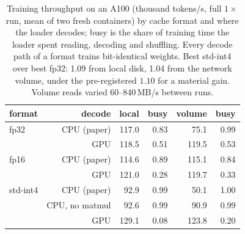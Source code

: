 \begin{table}[htbp]
\caption{Training throughput on an A100 (thousand tokens/s, full $1\times$ run, mean of two fresh containers) by cache format and where the loader decodes; busy is the share of training time the loader spent reading, decoding and shuffling. Every decode path of a format trains bit-identical weights. Best std-int4 over best fp32: 1.09 from local disk, 1.04 from the network volume, under the pre-registered $1.10$ for a material gain. Volume reads varied 60--840\,MB/s between runs.}
\label{tab:timing}
\centering\small
\begin{tabular}{lrrrrr}
\toprule
format & decode & local & busy & volume & busy \\
\midrule
fp32 & CPU (paper) & 117.0 & 0.83 & 75.1 & 0.99 \\
 & GPU & 118.5 & 0.51 & 119.5 & 0.53 \\
fp16 & CPU (paper) & 114.6 & 0.89 & 115.1 & 0.84 \\
 & GPU & 121.0 & 0.28 & 119.7 & 0.33 \\
std-int4 & CPU (paper) & 92.9 & 0.99 & 50.1 & 1.00 \\
 & CPU, no matmul & 92.6 & 0.99 & 90.9 & 0.99 \\
 & GPU & 129.1 & 0.08 & 123.8 & 0.20 \\
\bottomrule
\end{tabular}
\end{table}

